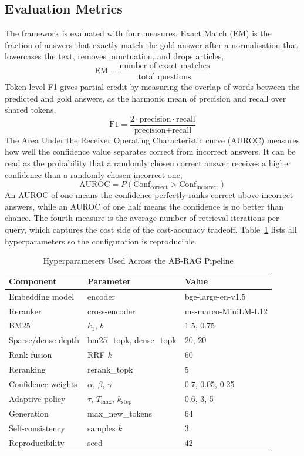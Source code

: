 \documentclass[conference,a4paper,10pt]{IEEEtran}
\begin{document}
\subsection{Evaluation Metrics}
The framework is evaluated with four measures. Exact Match (EM) is the fraction of
answers that exactly match the gold answer after a normalisation that lowercases the text,
removes punctuation, and drops articles,
\begin{equation}
\text{EM} = \frac{\text{number of exact matches}}{\text{total questions}}
\end{equation}
Token-level F1 gives partial credit by measuring the overlap of words between the
predicted and gold answers, as the harmonic mean of precision and recall over shared
tokens,
\begin{equation}
\text{F1} = \frac{2 \cdot \text{precision} \cdot \text{recall}}{\text{precision} + \text{recall}}
\end{equation}
The Area Under the Receiver Operating Characteristic curve (AUROC) measures how well the
confidence value separates correct from incorrect answers. It can be read as the
probability that a randomly chosen correct answer receives a higher confidence than a
randomly chosen incorrect one,
\begin{equation}
\text{AUROC} = P(\text{Conf}_{\text{correct}} > \text{Conf}_{\text{incorrect}})
\end{equation}
An AUROC of one means the confidence perfectly ranks correct above incorrect answers,
while an AUROC of one half means the confidence is no better than chance. The fourth
measure is the average number of retrieval iterations per query, which captures the cost
side of the cost-accuracy tradeoff. Table~\ref{tab:hyper} lists all hyperparameters so the
configuration is reproducible.

\begin{table}[t]
\centering
\caption{Hyperparameters Used Across the AB-RAG Pipeline}
\label{tab:hyper}
\renewcommand{\arraystretch}{1.15}
\begin{tabular}{p{2.55cm}p{2.6cm}p{2.4cm}}
\toprule
\textbf{Component} & \textbf{Parameter} & \textbf{Value} \\
\midrule
Embedding model & encoder & bge-large-en-v1.5 \\
Reranker & cross-encoder & ms-marco-MiniLM-L12 \\
BM25 & $k_1$, $b$ & 1.5, 0.75 \\
Sparse/dense depth & bm25\_topk, dense\_topk & 20, 20 \\
Rank fusion & RRF $k$ & 60 \\
Reranking & rerank\_topk & 5 \\
Confidence weights & $\alpha$, $\beta$, $\gamma$ & 0.7, 0.05, 0.25 \\
Adaptive policy & $\tau$, $T_{\max}$, $k_{\text{step}}$ & 0.6, 3, 5 \\
Generation & max\_new\_tokens & 64 \\
Self-consistency & samples $k$ & 3 \\
Reproducibility & seed & 42 \\
\bottomrule
\end{tabular}
\end{table}
\end{document}
